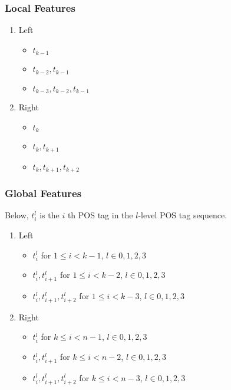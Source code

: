 \documentclass[11pt]{article}
\begin{document}
\subsubsection{Local Features}
\label{sec-4-1-1}
\begin{enumerate}
\item Left
\label{sec-4-1-1-1}
\begin{itemize}
\item $t_{k-1}$
\item $t_{k-2},t_{k-1}$
\item $t_{k-3},t_{k-2},t_{k-1}$
\end{itemize}

\item Right
\label{sec-4-1-1-2}
\begin{itemize}
\item $t_{k}$
\item $t_{k},t_{k+1}$
\item $t_{k},t_{k+1},t_{k+2}$
\end{itemize}
\end{enumerate}

\subsubsection{Global Features}
\label{sec-4-1-2}

Below, $t^{l}_{i}$ is the $i$ th POS tag in the $l$-level POS tag sequence.

\begin{enumerate}
\item Left
\label{sec-4-1-2-1}
\begin{itemize}
\item $t^l_{i}$ for $1 \le i < k - 1$, $l \in {0,1,2,3}$
\item $t^l_{i},t^l_{i+1}$ for $1 \le i < k - 2$, $l \in {0,1,2,3}$
\item $t^l_{i},t^l_{i+1},t^l_{i+2}$ for $1 \le i < k - 3$, $l \in {0,1,2,3}$
\end{itemize}

\item Right
\label{sec-4-1-2-2}
\begin{itemize}
\item $t^l_{i}$ for $k \le i < n - 1$, $l \in {0,1,2,3}$
\item $t^l_{i},t^l_{i+1}$ for $k \le i < n - 2$, $l \in {0,1,2,3}$
\item $t^l_{i},t^l_{i+1},t^l_{i+2}$ for $k \le i < n - 3$, $l \in {0,1,2,3}$
\end{itemize}
\end{enumerate}
\end{document}
